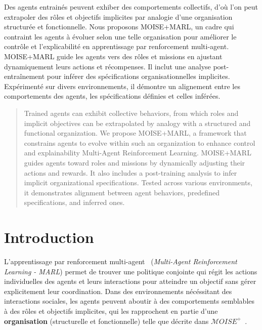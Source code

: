 \documentclass[final]{jfsma}
\begin{document}
\maketitle

\begin{resume}
  Des agents entrainés peuvent exhiber des comportements collectifs, d'où l'on peut extrapoler des rôles et objectifs implicites par analogie d'une organisation structurée et fonctionnelle. Nous proposons MOISE+MARL, un cadre qui contraint les agents à évoluer selon une telle organisation pour améliorer le contrôle et l'explicabilité en apprentissage par renforcement multi-agent.
  MOISE+MARL guide les agents vers des rôles et missions en ajustant dynamiquement leurs actions et récompenses. Il inclut une analyse post-entraînement pour inférer des spécifications organisationnelles implicites. Expérimenté sur divers environnements, il démontre un alignement entre les comportements des agents, les spécifications définies et celles inférées.
\end{resume}



\begin{abstract}
  Trained agents can exhibit collective behaviors, from which roles and implicit objectives can be extrapolated by analogy with a structured and functional organization. We propose MOISE+MARL, a framework that constrains agents to evolve within such an organization to enhance control and explainability Multi-Agent Reinforcement Learning.
  MOISE+MARL guides agents toward roles and missions by dynamically adjusting their actions and rewards. It also includes a post-training analysis to infer implicit organizational specifications. Tested across various environments, it demonstrates alignment between agent behaviors, predefined specifications, and inferred ones.
\end{abstract}


\section{Introduction}


L'apprentissage par renforcement multi-agent~\cite{maisonhaute2024} (\textit{Multi-Agent Reinforcement Learning - MARL}) permet de trouver une politique conjointe qui régit les actions individuelles des agents et leurs interactions pour atteindre un objectif sans gérer explicitement leur coordination. Dans des environnements nécéssitant des interactions sociales, les agents peuvent aboutir à des comportements semblables à des rôles et objectifs implicites, qui les rapprochent en partie d'une \textbf{organisation} (structurelle et fonctionnelle) telle que décrite dans $\mathcal{M}OISE^+$~\cite{Hubner2007}.
\end{document}
